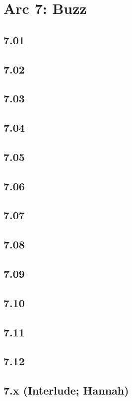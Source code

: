 \part*{Arc 7: Buzz}
 \chapter*{7.01}
 \chapter*{7.02}
 \chapter*{7.03}
 \chapter*{7.04}
 \chapter*{7.05}
 \chapter*{7.06}
 \chapter*{7.07}
 \chapter*{7.08}
 \chapter*{7.09}
 \chapter*{7.10}
 \chapter*{7.11}
 \chapter*{7.12}
 \chapter*{7.x (Interlude; Hannah)}














